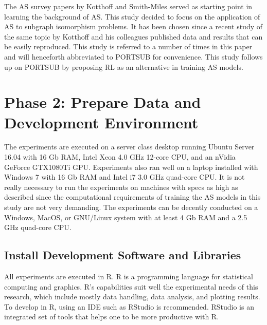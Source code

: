 The AS survey papers by Kotthoff \citep{kotthoff2016portfolios} and Smith-Miles \citep{smith2009cross} served as starting point in learning the background of AS. This study decided to focus on the application of AS to subgraph isomorphism problems. It has been chosen since a recent study of the same topic by Kotthoff and his colleagues \citep{kotthoff2016algorithm} published data and results that can be easily reproduced. This study is referred to a number of times in this paper and will henceforth abbreviated to PORTSUB for convenience. This study follows up on PORTSUB by proposing RL as an alternative in training AS models.

\section{Phase 2: Prepare Data and Development Environment} 
The experiments are executed on a server class desktop running Ubuntu Server 16.04 with 16 Gb RAM, Intel Xeon 4.0 GHz 12-core CPU, and an nVidia GeForce GTX1080Ti GPU. Experiments also ran well on a laptop installed with Windows 7 with 16 Gb RAM and Intel i7 3.0 GHz quad-core CPU. It is not really necessary to run the experiments on machines with specs as high as described since the computational requirements of training the AS models in this study are not very demanding. The experiments can be decently conducted on a Windows, MacOS, or GNU/Linux system with at least 4 Gb RAM and a 2.5 GHz quad-core CPU. 

\subsection{Install Development Software and Libraries}
All experiments are executed in R. R is a programming language for statistical computing and graphics. R’s capabilities suit well the experimental needs of this research, which include mostly data handling, data analysis, and plotting results. To develop in R, using an IDE such as RStudio is recommended. RStudio is an integrated set of tools that helps one to be more productive with R.

